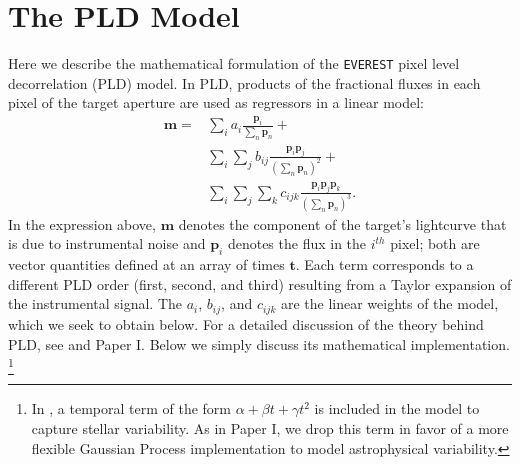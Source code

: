 \documentclass[]{emulateapj}
\newcommand{\edited}[1]{{\color{red} #1}}
\begin{document}
\section{The PLD Model}
\label{sec:model}
Here we describe the mathematical formulation of the \texttt{EVEREST}
pixel level decorrelation (PLD) model. In PLD, products of the fractional fluxes in each pixel
of the target aperture are used as regressors in a linear model:
%
\begin{align}
\label{eq:pldmodel}
\mathbf{m} = &\sum\limits_{i}                                 a_i     \frac{\mathbf{p}_{i}}                             { \sum\limits_{n}\mathbf{p}_{n}} +     \nonumber\\
             &\sum\limits_{i} \sum\limits_{j}                 b_{ij}  \frac{\mathbf{p}_{i}\mathbf{p}_{j}}               {(\sum\limits_{n}\mathbf{p}_{n})^2} +  \nonumber\\
             &\sum\limits_{i} \sum\limits_{j} \sum\limits_{k} c_{ijk} \frac{\mathbf{p}_{i}\mathbf{p}_{j}\mathbf{p}_{k}} {(\sum\limits_{n}\mathbf{p}_{n})^3}.
\end{align}
%
In the expression above, $\mathbf{m}$ \edited{denotes the component of the target's
lightcurve that is due to instrumental noise}
and $\mathbf{p}_{i}$ denotes the flux in
the $i^{th}$ pixel; both are vector quantities defined at an array of times $\mathbf{t}$.
Each term corresponds to a different PLD order (first, second, and third) resulting from
a Taylor expansion of the instrumental signal.
The $a_i$, $b_{ij}$, and $c_{ijk}$ are the linear weights of the model, which we seek
to obtain below. For a detailed discussion of the theory behind PLD, see
\cite{Deming15} and Paper I. Below we simply discuss its mathematical implementation.
\footnote{\edited{In \citet{Deming15},
a temporal term of the form $\alpha + \beta t + \gamma t^2$ is included in the model
to capture stellar variability. As in Paper I, we drop this term in favor of
a more flexible Gaussian Process implementation to model astrophysical variability.}}
\end{document}
